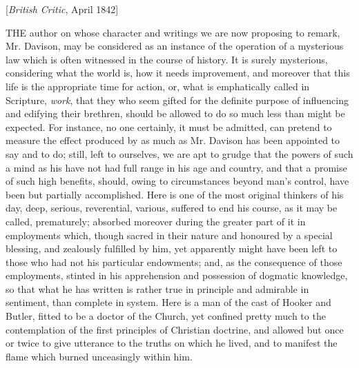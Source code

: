 
[\emph{British Critic}, April 1842]

THE
author on whose character and writings we are now proposing to remark,
Mr. Davison, may be considered as an instance of the operation of a
mysterious law which is often witnessed in the course of history. It
is surely mysterious, considering what the world is, how it needs
improvement, and moreover that this life is the appropriate time for
action, or, what is emphatically called in Scripture, \emph{work}, that they who seem gifted for the definite purpose of
influencing and edifying their brethren, should be allowed to do so
much less than might be expected. For instance, no one certainly, it
must be admitted, can pretend to measure the effect produced by as
much as Mr. Davison has been appointed to say and to do; still, left
to ourselves, we are apt to grudge that the powers of such a mind as
his have not had full range in his age and country, and that a promise
of such high benefits, should, owing to circumstances beyond man's
control, have been but partially accomplished. Here is one of the most
original thinkers of his day, deep, serious, reverential, various,
suffered to end his course, as it may be called, prematurely; absorbed
moreover during the greater part of it in employments which,
though sacred in their nature and honoured by a special blessing, and
zealously fulfilled by him, yet apparently might have been left to
those who had not his particular endowments; and, as the consequence
of those employments, stinted in his apprehension and possession of
dogmatic knowledge, so that what he has written is rather true in
principle and admirable in sentiment, than complete in system. Here is
a man of the cast of Hooker and Butler, fitted to be a doctor of the
Church, yet confined pretty much to the contemplation of the first
principles of Christian doctrine, and allowed but once or twice to
give utterance to the truths on which he lived, and to manifest the
flame which burned unceasingly within him.

